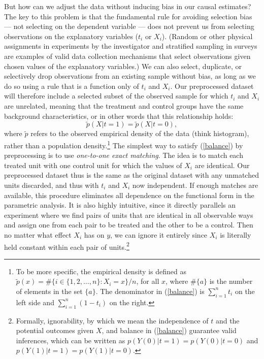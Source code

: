 \documentclass[11pt,titlepage]{article}
\begin{document}
But how can we adjust the data without inducing bias in our causal
estimates?  The key to this problem is that the fundamental rule for
avoiding selection bias --- not selecting on the dependent variable
--- does not prevent us from selecting observations on the explanatory
variables ($t_i$ or $X_i$).  (Random or other physical assignments in
experiments by the investigator and stratified sampling in surveys are
examples of valid data collection mechanisms that select observations
given chosen values of the explanatory variables.)  We can also
select, duplicate, or selectively drop observations from an existing
sample without bias, as long as we do so using a rule that is a
function only of $t_i$ and $X_i$.  Our preprocessed dataset will
therefore include a selected subset of the observed sample for which
$t_i$ and $X_i$ are unrelated, meaning that the treatment and control
groups have the same background characteristics, or in other words
that this relationship holds:
\begin{equation}
  \label{balance}
  \tilde p(X|t=1) = \tilde p(X|t=0),
\end{equation}
where $\tilde p$ refers to the observed empirical density of the data
(think histogram), rather than a population density.\footnote{To be
  more specific, the empirical density is defined as $\tilde p(x) = \#
  \{ i\in \{1, 2, \dots, n \}: X_i = x \} / n$, for all $x$, where
  $\#\{a\}$ is the number of elements in the set $\{a\}$.  The
  denominator in (\ref{balance}) is $\sum_{i=1}^n t_i$ on the left
  side and $\sum_{i=1}^n (1-t_i)$ on the right.}  The simplest way to
satisfy (\ref{balance}) by preprocessing is to use \emph{one-to-one
  exact matching}.  The idea is to match each treated unit with one
control unit for which the values of $X_i$ are identical.  Our
preprocessed dataset thus is the same as the original dataset with any
unmatched units discarded, and thus with $t_i$ and $X_i$ now
independent.  If enough matches are available, this procedure
eliminates all dependence on the functional form in the parametric
analysis.  It is also highly intuitive, since it directly parallels an
experiment where we find pairs of units that are identical in all
observable ways and assign one from each pair to be treated and the
other to be a control.  Then no matter what effect $X_i$ has on $y$,
we can ignore it entirely since $X_i$ is literally held constant
within each pair of units.\footnote{Formally, ignorability, by which
  we mean the independence of $t$ and the potential outcomes given
  $X$, and balance in (\ref{balance}) guarantee valid inferences,
  which can be written as $p(Y(0)|t=1)=p(Y(0)|t=0)$ and
  $p(Y(1)|t=1)=p(Y(1)|t=0)$.}
\end{document}

